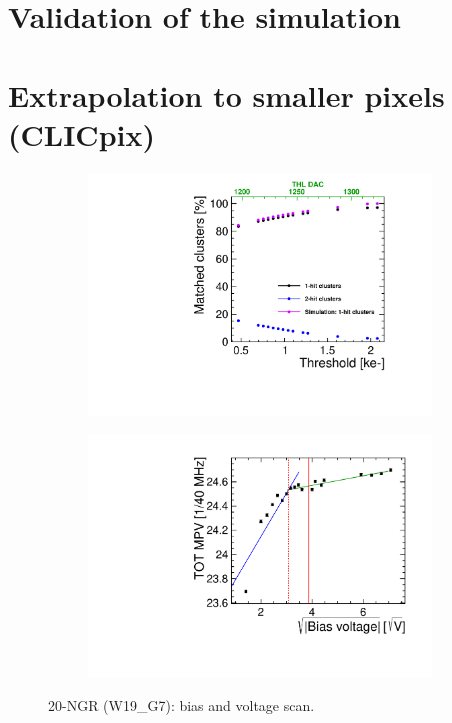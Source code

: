 \section{Validation of the simulation}
\section{Extrapolation to smaller pixels (CLICpix)}

\begin{figure}[htbp] \centering
  \begin{subfigure}[b]{0.45\textwidth}
    \includegraphics[width=\textwidth]{./figures/TestBeam/ThresholdScan_W0019_G07.pdf}
    \caption{}
  \end{subfigure} \hfill
  \begin{subfigure}[b]{0.45\textwidth}
    \includegraphics[width=\textwidth]{./figures/TestBeam/depletionVoltage_W0019_G07.pdf}
    \caption{}
  \end{subfigure}
  \caption{20-NGR (W19\_G7): bias and voltage scan.}
  \label{fig:Timepix3_THLscan_Vdep_G7}
\end{figure}

